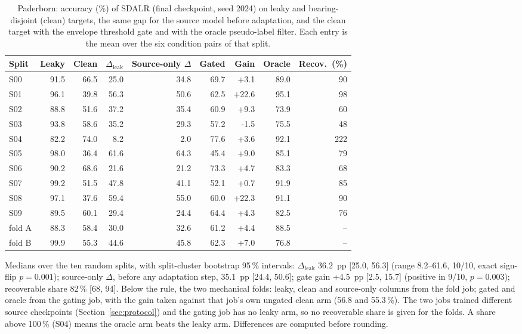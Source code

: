 \begin{table}[htbp]
\centering
\caption{Paderborn: accuracy (\%) of SDALR (final checkpoint, seed 2024) on leaky and bearing-disjoint (clean) targets, the same gap for the source model before adaptation, and the clean target with the envelope threshold gate and with the oracle pseudo-label filter. Each entry is the mean over the six condition pairs of that split.}
\label{tab:collapse}
\small
\setlength{\tabcolsep}{4pt}
\begin{tabular}{lrrrrrrrr}
\toprule
Split & Leaky & Clean & $\Delta_{\mathrm{leak}}$ & Source-only $\Delta$ & Gated & Gain & Oracle & Recov.\ (\%) \\
\midrule
S00 & 91.5 & 66.5 & 25.0 & 34.8 & 69.7 & +3.1 & 89.0 & 90 \\
S01 & 96.1 & 39.8 & 56.3 & 50.6 & 62.5 & +22.6 & 95.1 & 98 \\
S02 & 88.8 & 51.6 & 37.2 & 35.4 & 60.9 & +9.3 & 73.9 & 60 \\
S03 & 93.8 & 58.6 & 35.2 & 29.3 & 57.2 & -1.5 & 75.5 & 48 \\
S04 & 82.2 & 74.0 & 8.2 & 2.0 & 77.6 & +3.6 & 92.1 & 222 \\
S05 & 98.0 & 36.4 & 61.6 & 64.3 & 45.4 & +9.0 & 85.1 & 79 \\
S06 & 90.2 & 68.6 & 21.6 & 21.2 & 73.3 & +4.7 & 83.3 & 68 \\
S07 & 99.2 & 51.5 & 47.8 & 41.1 & 52.1 & +0.7 & 91.9 & 85 \\
S08 & 97.1 & 37.6 & 59.4 & 55.0 & 60.0 & +22.3 & 91.1 & 90 \\
S09 & 89.5 & 60.1 & 29.4 & 24.4 & 64.4 & +4.3 & 82.5 & 76 \\
\midrule
fold A & 88.3 & 58.4 & 30.0 & 32.6 & 61.2 & +4.4 & 88.5 & -- \\
fold B & 99.9 & 55.3 & 44.6 & 45.8 & 62.3 & +7.0 & 76.8 & -- \\
\bottomrule
\end{tabular}
\begin{minipage}{\linewidth}\vspace{2pt}\footnotesize Medians over the ten random splits, with split-cluster bootstrap 95\,\% intervals: $\Delta_{\mathrm{leak}}$ 36.2~pp [25.0, 56.3] (range 8.2--61.6, 10/10, exact sign-flip $p = 0.001$); source-only $\Delta$, before any adaptation step, 35.1~pp [24.4, 50.6]; gate gain +4.5~pp [2.5, 15.7] (positive in 9/10, $p=0.003$); recoverable share 82\,\% [68, 94]. Below the rule, the two mechanical folds: leaky, clean and source-only columns from the fold job; gated and oracle from the gating job, with the gain taken against that job's own ungated clean arm (56.8 and 55.3\,\%). The two jobs trained different source checkpoints (Section~\ref{sec:protocol}) and the gating job has no leaky arm, so no recoverable share is given for the folds. A share above 100\,\% (S04) means the oracle arm beats the leaky arm. Differences are computed before rounding.\end{minipage}
\end{table}
